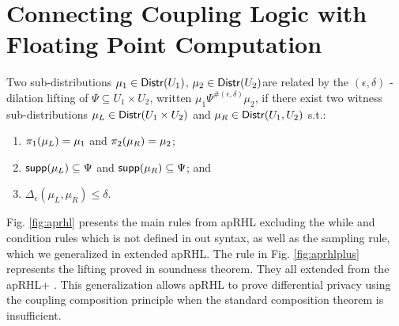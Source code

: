 \documentclass[a4paper,11pt]{article}
\begin{document}
\section{
Connecting Coupling Logic
%
with Floating Point Computation
}
%
\begin{defn}
Two sub-distributions $\mu_1 \in \mathsf{Distr}(U_1)$, $\mu_2 \in \mathsf{Distr}(U_2)$are related by the $(\epsilon, \delta)$ - dilation lifting of $\Psi \subseteq U_1 \times U_2$, written $\mu_1 \Psi^{\#(\epsilon, \delta)} \mu_2$, if there exist two witness sub-distributions $\mu_L \in \mathsf{Distr}(U_1 \times U_2)$ and $\mu_R \in \mathsf{Distr}(U_1, U_2)$ s.t.:
\begin{enumerate}
	\item $\pi_1(\mu_L) = \mu_1$ and $\pi_2(\mu_R) = \mu_2$;
	\item $\mathsf{supp}(\mu_L) \subseteq \Psi$ and $\mathsf{supp}(\mu_R) \subseteq \Psi$; and
	\item $\Delta_{\epsilon}(\mu_L, \mu_R) \leq \delta$.
\end{enumerate}
\end{defn}
%
Fig. \ref{fig:aprhl} presents the main rules from apRHL excluding the while and condition rules which is not defined in out syntax, as well as the sampling rule, which we generalized in extended apRHL.
The rule in Fig. \ref{fig:aprhlplus} represents the lifting proved in soundness theorem. They all extended from the apRHL+ \cite{barthe2016proving}. This generalization allows apRHL to prove differential privacy using the coupling composition principle when the standard composition theorem is insufficient.
%
\end{document}
